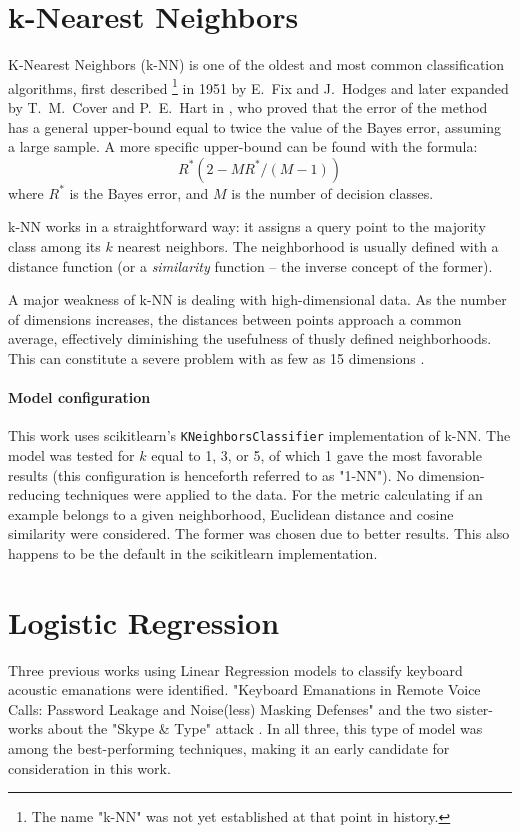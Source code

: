 \documentclass[../main.tex]{subfiles}
\begin{document}
\section{k-Nearest Neighbors}
\label{sec:models_knn}
K-Nearest Neighbors (k-NN) is one of the oldest and most common classification algorithms, first described%
\footnote{The name "k-NN" was not yet established at that point in history.} in 1951
by E.\ Fix and J.\ Hodges \cite{knn1951} and later expanded by T.\ M.\ Cover and
P.\ E.\ Hart in \cite{nnpatternclassification1967}, who proved that the error of
the method has a general upper-bound equal to twice the value of the Bayes error,
assuming a large sample. A more specific upper-bound can be found with the formula:
\begin{equation}
    R^* (2 - MR^*/(M-1))
\end{equation}
where $R^*$ is the Bayes error, and $M$ is the number of decision classes.

k-NN works in a straightforward way: it assigns a query point to the majority class among its $k$ nearest neighbors. The neighborhood is usually defined with a distance function (or a \emph{similarity} function -- the inverse concept of the former).

A major weakness of k-NN is dealing with high-dimensional data. As the number of dimensions increases, the distances between points approach a common average, effectively diminishing the usefulness of thusly defined neighborhoods.
This can constitute a severe problem with as few as 15 dimensions \cite{whenisnn1997}.

\paragraph{Model configuration}
This work uses scikitlearn's \verb`KNeighborsClassifier` implementation of k-NN.
The model was tested for $k$ equal to 1, 3, or 5, of which 1 gave the most favorable
results (this configuration is henceforth referred to as "1-NN"). No dimension-reducing
techniques were applied to the data. For the metric calculating if an example belongs to a 
given neighborhood, Euclidean distance and cosine similarity were considered. The former
was chosen due to better results. This also happens to be the default in the scikitlearn
implementation.

\section{Logistic Regression}
\label{sec:models_logistic_regression}
Three previous works using Linear Regression models to classify keyboard acoustic emanations were identified.
"Keyboard Emanations in Remote Voice Calls: Password Leakage and Noise(less) Masking Defenses" \cite{defenses2018}
and the two sister-works about the "Skype \& Type" attack \cite{skype2017, skype2019}.
In all three, this type of model was among the best-performing techniques, making it an early candidate
for consideration in this work.
\end{document}
